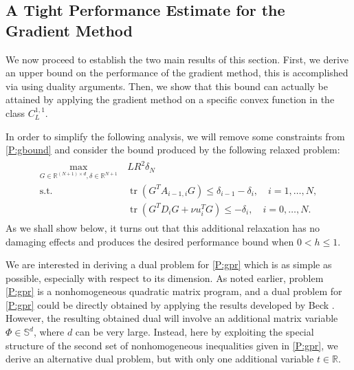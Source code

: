 \documentclass[12pt]{article}
\numberwithin{equation}{section}
\theoremstyle{definition}
\theoremstyle{remark}
\DeclareMathOperator{\trace}{tr}
\def\real{\mathbb{R}}
\begin{document}
\subsection{A Tight Performance Estimate for the Gradient Method}\label{sub-tight}


We now proceed to establish the two main results of this section. First, we derive an upper
bound on the performance of the gradient method, this is accomplished via using duality
arguments. Then, we show that this bound can actually be attained by applying the gradient
method on a specific convex function in the class $C^{1,1}_L$.


In order to simplify
the following analysis,
we will remove some constraints from \eqref{P:gbound} and consider
the bound produced by the following relaxed problem:
\begin{align*}
    \begin{aligned}
    \max_{G\in \mathbb{R}^{(N+1)\times d},\delta \in\mathbb{R}^{N+1}}\ &  LR^2 \delta_N \\
    \text{s.t. }
                        & \trace (G^T A_{i-1,i} G) \leq \delta_{i-1} - \delta_i,\quad    i=1,\dots,N, \\
                        & \trace(G^T D_i G+ \nu u_i^T G ) \leq - \delta_i,\quad     i=0,\dots,N.
    \end{aligned}
    \tag{G$^\prime$}\label{P:gpr}
\end{align*}
As we shall show below, it turns out that this additional relaxation has no
damaging effects and produces the desired performance bound when $0< h\leq 1$.
\medskip

We are interested in deriving a  dual problem for \eqref{P:gpr} which is as simple as
possible, especially with respect to its dimension. As noted earlier, problem \eqref{P:gpr} is
a nonhomogeneous quadratic matrix program, and a dual problem for \eqref{P:gpr} could be
directly obtained by applying the results developed by Beck \cite{beck-qm06}. However, the
resulting obtained dual will involve an additional matrix variable $\Phi \in \mathbb{S}^d$,
where $d$ can be very large. Instead, here by exploiting the special structure of the second
set of nonhomogeneous inequalities given in \eqref{P:gpr}, we derive an alternative  dual
problem, but with only one additional variable $t \in \real$.
\end{document}
